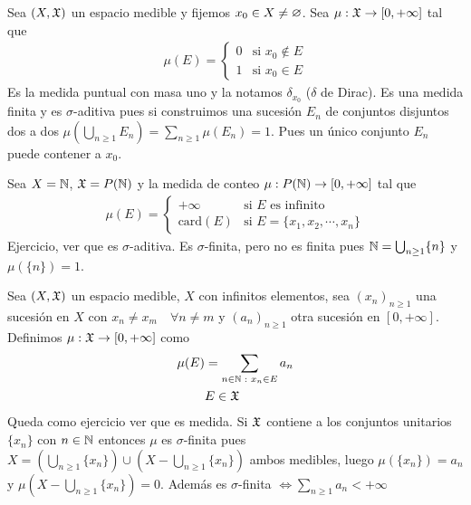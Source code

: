 \begin{eg}
    Sea $(X, \mathfrak{X})$ un espacio medible y fijemos $x_0 \in X \neq \varnothing$.
    Sea $\mu : \mathfrak{X} \to [0, +\infty]$ tal que \begin{align*}
        \mu(E) = \begin{cases}
                     0 & \text{si } x_0 \notin E \\
                     1 & \text{si } x_0 \in E
                 \end{cases}
    \end{align*}
    Es la medida puntual con masa uno y la notamos $\delta_{x_0}$ ($\delta$ de Dirac). Es una medida finita y es $\sigma$-aditiva pues si construimos
    una sucesión $E_n$ de conjuntos disjuntos dos a dos $\mu (\bigcup_{n \geq 1} E_n) = \sum_{n \geq 1} \mu(E_n) = 1$. Pues un único conjunto $E_n$ puede contener a $x_0$.
\end{eg}

\clearpage

\begin{eg}
    Sea $X = \mathbb{N}$, $\mathfrak{X} = P(\mathbb{N})$ y la medida de conteo $\mu : P(\mathbb{N}) \to [0, +\infty]$ tal que \begin{align*}
        \mu(E) = \begin{cases}
                     +\infty        & \text{si } E \text{ es infinito}           \\
                     \text{card}(E) & \text{si } E = \{ x_1, x_2, \cdots, x_n \}
                 \end{cases}
    \end{align*}
    Ejercicio, ver que es $\sigma$-aditiva. Es $\sigma$-finita, pero no es finita pues $\mathbb{N} = \bigcup_{n \geq 1} \{ n \}$ y $\mu(\{ n \}) = 1$.
\end{eg}

\begin{eg}
    Sea $(X, \mathfrak{X})$ un espacio medible, $X$ con infinitos elementos, sea $(x_n)_{n \geq 1}$ una sucesión en $X$ con $x_n \neq x_m \quad \forall n \neq m$ y
    $(a_n)_{n \geq 1}$ otra sucesión en $[0, +\infty]$. Definimos $\mu : \mathfrak{X} \to [0, +\infty]$ como \begin{align*}
        \mu(E) & = \sum_{n \in \mathbb{N} \text{ } : \text{ } x_n \in E} a_n \\
               & E \in \mathfrak{X}
    \end{align*}
    Queda como ejercicio ver que es medida.
    Si $\mathfrak{X}$ contiene a los conjuntos unitarios $\{ x_n \}$ con $n \in \mathbb{N}$ entonces $\mu$ es $\sigma$-finita pues $X = (\bigcup_{n \geq 1} \{ x_n \}) \cup (X - \bigcup_{n \geq 1} \{ x_n \})$ ambos medibles, luego
    $\mu(\{ x_n \}) = a_n$ y $\mu(X - \bigcup_{n \geq 1} \{ x_n \}) = 0$.
    Además es $\sigma$-finita $\iff \sum_{n \geq 1} a_n < +\infty$
\end{eg}

